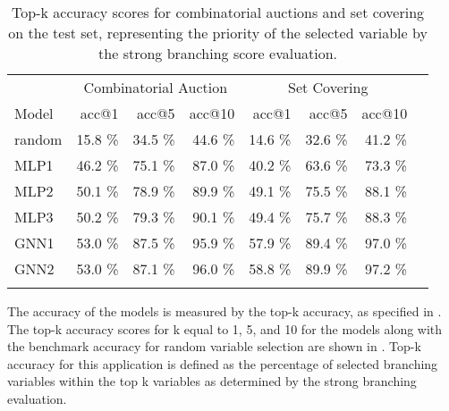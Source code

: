 \begin{scriptsize}
\begin{table}[ht]
	\centering
	\begin{tabular}{lrrrrrrr}
		\toprule
		& \multicolumn{3}{c}{Combinatorial Auction} & \multicolumn{3}{c}{Set Covering}\\ 
		\cmidrule(lr){2-4} \cmidrule(lr){5-7}
		Model & acc@1 & acc@5 & acc@10 & acc@1 & acc@5 & acc@10 \\
		\midrule
		random & 15.8 \% & 34.5 \% & 44.6 \% & 14.6 \% & 32.6 \% & 41.2 \%\\
		MLP1 & 46.2 \% & 75.1 \% & 87.0 \% & 40.2 \% & 63.6 \% & 73.3 \%\\
		MLP2 & 50.1 \% & 78.9 \% & 89.9 \% & 49.1 \% & 75.5 \% & 88.1 \%\\
		MLP3 & 50.2 \% & 79.3 \% & 90.1 \% & 49.4 \% & 75.7 \% & 88.3 \%\\
		GNN1 & 53.0 \% & 87.5 \% & 95.9 \% & 57.9 \% & 89.4 \% & 97.0 \%\\
		GNN2 & 53.0 \% & 87.1 \% & 96.0 \% & 58.8 \% & 89.9 \% & 97.2 \%\\
		\addlinespace
		\bottomrule
	\end{tabular}
	\caption{Top-k accuracy scores for combinatorial auctions and set covering on the test set, representing the priority of the selected variable by the strong branching score evaluation.}\label{tab:accs}
\end{table}
\end{scriptsize}

 
The accuracy of the models is measured by the top-k accuracy, as specified in .
The top-k accuracy scores for k equal to 1, 5, and 10 for the models along with the benchmark accuracy for random variable selection are shown in . Top-k accuracy for this application is defined as the percentage of selected branching variables within the top k variables as determined by the strong branching evaluation. 

